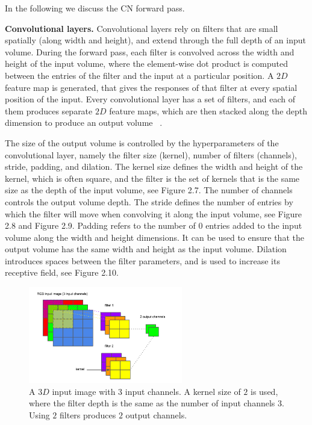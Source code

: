 \noindent In the following we discuss the CN forward pass. \par

\noindent \textbf{Convolutional layers.} Convolutional layers rely on filters that are small spatially (along width and height), and extend through the full depth of an input volume. During the forward pass, each filter is convolved across the width and height of the input volume, where the element-wise dot product is computed between the entries of the filter and the input at a particular position. A $ 2D $ feature map is generated, that gives the responses of that filter at every spatial position of the input. Every convolutional layer has a set of filters, and each of them produces separate $ 2D $ feature maps, which are then stacked along the depth dimension to produce an output volume \unskip ~\citep{DLIndaba2017}. \par

\noindent  The size of the output volume is controlled by the hyperparameters of the convolutional layer, namely the filter size (kernel), number of filters (channels), stride, padding, and dilation. The kernel size defines the width and height of the kernel, which is often square, and the filter is the set of kernels that is the same size as the depth of the input volume, see Figure 2.7. The number of channels controls the output volume depth. The stride defines the number of entries by which the filter will move when convolving it along the input volume, see Figure 2.8 and Figure 2.9. Padding refers to the number of $ 0 $ entries added to the input volume along the width and height dimensions. It can be used to ensure that the output volume has the same width and height as the input volume. Dilation introduces spaces between the filter parameters, and is used to increase its receptive field, see Figure 2.10. \par

\begin{figure}[H]
   	\centering
    	\includegraphics[width=0.6\textwidth, height=0.3\textwidth]{channels}
	\captionsetup{justification=centering}
	\caption{A $ 3D $ input image with 3 input channels. A kernel size of $ 2 $ is used, where the filter depth is the same as the number of input channels $ 3 $. Using $ 2 $ filters produces $ 2 $ output channels.}
\end{figure}

